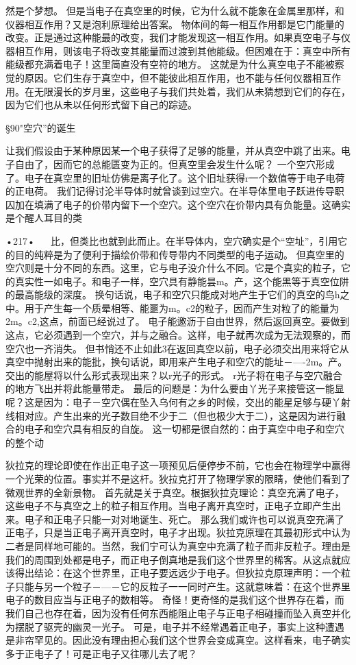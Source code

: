  
然是个梦想。
但是当电子在真空里的时候，它为什么就不能象在金属里那样，和仪器相互作用？又是泡利原理给出答案。
物体间的每一相互作用都是它门能量的改变。正是通过这种能最的改变，我们才能发现这一相互作用。如果真空电子与仪器相互作用，则该电子将改变其能量而过渡到其他能级。但困难在于：真空中所有能级都充满着电子！这里简直没有空符的地方。
这就是为什么真空电子不能被察觉的原因。它们生存于真空中，但不能彼此相互作用，也不能与任何仪器相互作用。在无限漫长的岁月里，这些电子与我们共处着，我们从未猜想到它们的存在，因为它们也从未以任何形式留下自己的踪迹。

§90"空穴”的诞生

让我们假设由于某种原因某一个电子获得了足够的能量，并从真空中跳了出来。电子自由了，因而它的总能匮变为正的。但真空里会发生什么呢？
一个空穴形成了。电子在真空里的旧址仿佛是离子化了。这个旧址获得r一个数值等于电子电荷的正电荷。
我们记得讨沦半导体时就曾谈到过空穴。在半导体里电子跃进传导职囚加在填满了电子的价带内留下一个空穴。这个空穴在价带内具有负能量。这确实是个醒人耳目的类

•217•
  
比，但类比也就到此而止。在半导体内，空穴确实是个“空址”，引用它的目的纯粹是为了便利于描绘价带和传导带内不同类型的电子运动。
但真空里的空穴则是十分不同的东西。这里，它与电子没介什么不同。它是个真实的粒子，它的真实性一如电子。和电子一样，空穴具有静能昙m。产，这个能黑等于真空位阱的最高能级的深度。
换句话说，电子和空穴只能成对地产生于它们的真空的鸟h之中。用于产生每一个质晕相等、能噩为m。c2的粒子，因而产生对粒了的能量为2m。c2,这点，前面已经说过了。
电子能邀沥于自由世界，然后返回真空。要做到这点，它必须遇到一个空穴，并与之融合。这样，电子就再次成为无法观察的，而空穴也一齐消失。
但书悄还不止如此3在返回真空以前，电子必须交出用来将它从真空中抛射出来的能批，换句话说，即用来产生电子和空穴的能址－—-2m。产。
交出的能屋将以什么形式表现出来？以r光子的形式。
r光子将在电子与空穴融合的地方飞出并将此能量带走。
最后的问题是：为什么要由丫光子来接管这一能显呢？这是因为：电子－空穴偶在坠入乌何有之乡的时候，交出的能星足够与硬丫射线相对应。产生出来的光子数目绝不少于二（但也极少大于二），这是因为进行融合的电子和空穴具有相反的自旋。
这一切都是很自然的：由于真空中电子和空穴的整个动

狄拉克的理论即使在作出正电子这一项预见后便停步不前，它也会在物理学中赢得一个光荣的位置。事实并不是这杆。狄拉克打开了物理学家的限睛，使他们看到了微观世界的全新景物。
首先就是关于真空。根据狄拉克理论：真空充满了电子，这些电子不与真空之上的粒子相互作用。当电子离开真空时，正电子立即产生出来。电子和正电子只能一对对地诞生、死亡。
那么我们或许也可以说真空充满了正电子，只是当正电子离开真空时，电子才出现。狄拉克原理在其最初形式中认为二者是同样地可能的。当然，我们宁可认为真空中充满了粒子而非反粒子。理由是我们的周围到处都是电子，而正电子倒真地是我们这个世界里的稀客。从这点就应该得出结论：在这个世界里，正电子要远远少于电子。但狄拉克原理声明：一个粒子只能与另一个粒子－—－它的反粒子一一同时产生。这就意味着：在这个世界里电子的数目应当与正电子的数相等。
奇怪！更奇怪的是我们这个世界存在着，而我们自己也存在着，因为没有任何东西能阻止电子与正电子相碰撞而坠入真空并化为摆脱了驱壳的幽灵一光子。
可是，电子并不经常遇着正电子，事实上这种遭遇是非帘罕见的。因此没有理由担心我们这个世界会变成真空。这样看来，电子确实多于正电子了！可是正电子又往哪儿去了呢？


